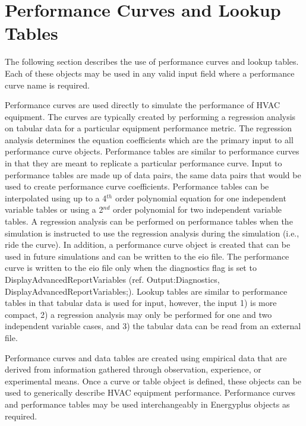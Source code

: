 \chapter{Performance Curves and Lookup Tables}\label{performance-curves-and-lookup-tables}

The following section describes the use of performance curves and lookup tables. Each of these objects may be used in any valid input field where a performance curve name is required.

Performance curves are used directly to simulate the performance of HVAC equipment. The curves are typically created by performing a regression analysis on tabular data for a particular equipment performance metric. The regression analysis determines the equation coefficients which are the primary input to all performance curve objects. Performance tables are similar to performance curves in that they are meant to replicate a particular performance curve. Input to performance tables are made up of data pairs, the same data pairs that would be used to create performance curve coefficients. Performance tables can be interpolated using up to a 4\(^{th}\) order polynomial equation for one independent variable tables or using a 2\(^{nd}\) order polynomial for two independent variable tables. A regression analysis can be performed on performance tables when the simulation is instructed to use the regression analysis during the simulation (i.e., ride the curve). In addition, a performance curve object is created that can be used in future simulations and can be written to the eio file. The performance curve is written to the eio file only when the diagnostics flag is set to DisplayAdvancedReportVariables (ref. Output:Diagnostics, DisplayAdvancedReportVariables;). Lookup tables are similar to performance tables in that tabular data is used for input, however, the input 1) is more compact, 2) a regression analysis may only be performed for one and two independent variable cases, and 3) the tabular data can be read from an external file.

Performance curves and data tables are created using empirical data that are derived from information gathered through observation, experience, or experimental means. Once a curve or table object is defined, these objects can be used to generically describe HVAC equipment performance. Performance curves and performance tables may be used interchangeably in Energyplus objects as required.
